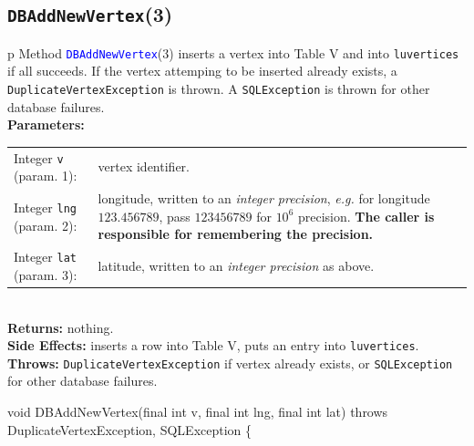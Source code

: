 \subsection{\texttt{DBAddNewVertex}(3)}
\begin{tabular}{p{\textwidth}}
\toprule
{}
Method \textcolor{blue}{{\tt{}\protect{}DBAddNewVertex}}(3) inserts a vertex into
Table V and into {\tt{}lu{}vertices} if all succeeds. If the vertex attemping
to be inserted already exists, a {\tt{}DuplicateVertexException} is thrown.
A {\tt{}SQLException} is thrown for other database failures.\\
\midrule
\textbf{Parameters:} \\
\begin{tabular}{lp{116mm}}
Integer {\tt{}v} (param. 1):&vertex identifier.\\
Integer {\tt{}lng} (param. 2):&longitude, written to an \emph{integer
precision}, \emph{e.g.} for longitude $123.456789$, pass $123456789$ for
$10^6$ precision. \textbf{The caller is responsible for remembering the
precision.}\\
Integer {\tt{}lat} (param. 3):&latitude, written to an \emph{integer
precision} as above.
\end{tabular}\\
\textbf{Returns:} nothing.\\
\textbf{Side Effects:} inserts a row into Table V, puts an entry into
{\tt{}lu{}vertices}.\\
\textbf{Throws:} {\tt{}DuplicateVertexException} if vertex already exists,
or {\tt{}SQLException} for other database failures.\\
\bottomrule
\end{tabular}
\nwenddocs{}\endmoddef{}
void DBAddNewVertex(final int v, final int lng, final int lat)
throws DuplicateVertexException, SQLException \{
\eatline
{}\nwendcode{}

